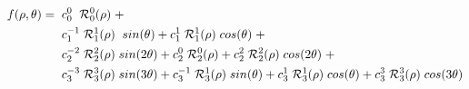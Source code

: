 \begin{align}
    f(\rho,\theta) =  \hspace{.2cm} & c_0^0 \hspace{.2cm} \mathcal{R}_0^{0}(\rho) \hspace{.1cm} + \\
    & c_{1}^{-1} \hspace{.1cm} \mathcal{R}_1^{1}(\rho) \hspace{.2cm} sin(\theta)  + c_{1}^{1} \hspace{.1cm} \mathcal{R}_1^{1}(\rho) \hspace{.1cm} cos(\theta) \hspace{.1cm}+ \\
    & c_{2}^{-2} \hspace{.1cm} \mathcal{R}_2^{2}(\rho) \hspace{.1cm} sin(2\theta) + c_{2}^{0} \hspace{.1cm} \mathcal{R}_2^{0}(\rho) + c_{2}^{2} \hspace{.1cm} \mathcal{R}_2^{2}(\rho) \hspace{.1cm} cos(2\theta) \hspace{.1cm}+  \\
    & c_{3}^{-3} \hspace{.1cm} \mathcal{R}_3^{3}(\rho) \hspace{.1cm} sin(3\theta) + c_{3}^{-1} \hspace{.1cm} \mathcal{R}_3^{1}(\rho) \hspace{.1cm} sin(\theta) + c_{3}^{1} \hspace{.1cm} \mathcal{R}_3^{1}(\rho) \hspace{.1cm} cos(\theta) + c_{3}^{3} \hspace{.1cm} \mathcal{R}_3^{3}(\rho) \hspace{.1cm} cos(3\theta)
\end{align}
















